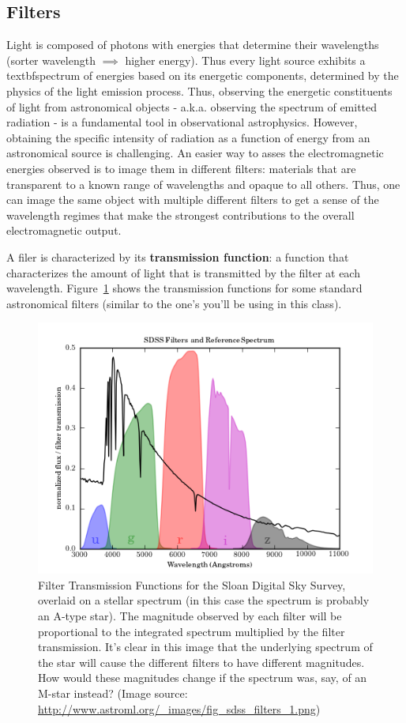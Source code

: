 \subsection{Filters}
Light is composed of photons with energies that determine their wavelengths (sorter wavelength $\implies$ higher energy). Thus every light source exhibits a textbf{spectrum} of energies based on its energetic components, determined by the physics of the light emission process. Thus, observing the energetic constituents of light from astronomical objects - a.k.a. observing the spectrum of emitted radiation - is a fundamental tool in observational astrophysics. However, obtaining the specific intensity of radiation as a function of energy from an astronomical source is challenging. An easier way to asses the electromagnetic energies observed is to image them in different filters: materials that are transparent to a known range of wavelengths and opaque to all others. Thus, one can image the same object with multiple different filters to get a sense of the wavelength regimes that make the strongest contributions to the overall electromagnetic output. 

A filer is characterized by its \textbf{transmission function}: a function that characterizes the amount of light that is transmitted by the filter at each wavelength. Figure~\ref{sot:fig:filters} shows the transmission functions for some standard astronomical filters (similar to the one's you'll be using in this class).

\begin{figure}
	\centering
	\includegraphics{small-optical-telescopes/fig_sdss_filters_1.png}
	\caption{Filter Transmission Functions for the Sloan Digital Sky Survey, overlaid on a stellar spectrum (in this case the spectrum is probably an
		A-type star). The magnitude observed by each filter will be proportional to the integrated spectrum multiplied by the filter transmission. It's clear in this image that the underlying spectrum of the star will cause the different filters to have different magnitudes. How would these magnitudes change if the spectrum was, say, of an M-star instead? (Image source: \url{http://www.astroml.org/\_images/fig\_sdss\_filters\_1.png})}\label{sot:fig:filters}
\end{figure}

